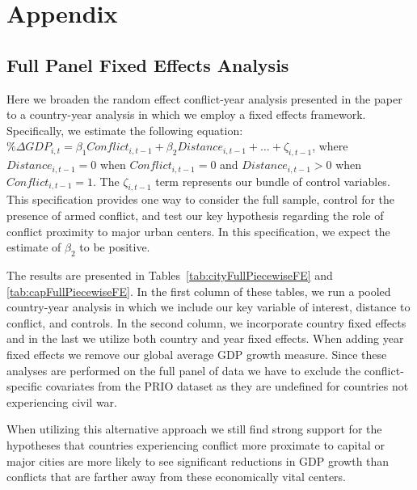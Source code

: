 
\newpage
\section{Appendix}
\label{appendix}

\subsection{Full Panel Fixed Effects Analysis}

Here we broaden the random effect conflict-year analysis presented in the paper to a country-year analysis in which we employ a fixed effects framework. Specifically, we estimate the following equation: $\% \Delta GDP_{i,t} = \beta_{1}Conflict_{i,t-1} + \beta_{2}Distance_{i,t-1}+\ldots+\zeta_{i,t-1}$, where $Distance_{i,t-1}=0$ when $Conflict_{i,t-1}=0$ and $Distance_{i,t-1}>0$ when $Conflict_{i,t-1}=1$. The $\zeta_{i,t-1}$ term represents our bundle of control variables. This specification provides one way to consider the full sample, control for the presence of armed conflict, and test our key hypothesis regarding the role of conflict proximity to major urban centers. In this specification, we expect the estimate of $\beta_{2}$ to be positive.

The results are presented in Tables~\ref{tab:cityFullPiecewiseFE} and \ref{tab:capFullPiecewiseFE}. In the first column of these tables, we run a pooled country-year analysis in which we include our key variable of interest, distance to conflict, and controls. In the second column, we incorporate country fixed effects and in the last we utilize both country and year fixed effects. When adding year fixed effects we remove our global average GDP growth measure. Since these analyses are performed on the full panel of data we have to exclude the conflict-specific covariates from the PRIO dataset as they are undefined for countries not experiencing civil war. 

When utilizing this alternative approach we still find strong support for the hypotheses that countries experiencing conflict more proximate to capital or major cities are more likely to see significant reductions in GDP growth than conflicts that are farther away from these economically vital centers.


\FloatBarrier


\FloatBarrier


